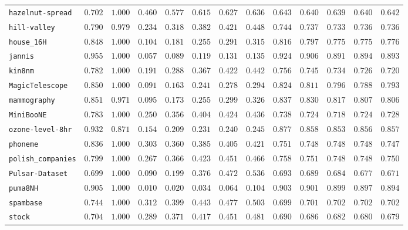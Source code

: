 {\begin{tabular}{@{}lcccccccccccc@{}}
\texttt{hazelnut-spread} & $0.702$ & $1.000$ & $0.460$ & $0.577$ & $0.615$ & $0.627$ & $0.636$ & $0.643$ & $0.640$ & $0.639$ & $0.640$ & $0.642$ \\
\texttt{hill-valley} & $0.790$ & $0.979$ & $0.234$ & $0.318$ & $0.382$ & $0.421$ & $0.448$ & $0.744$ & $0.737$ & $0.733$ & $0.736$ & $0.736$ \\
\texttt{house\_16H} & $0.848$ & $1.000$ & $0.104$ & $0.181$ & $0.255$ & $0.291$ & $0.315$ & $0.816$ & $0.797$ & $0.775$ & $0.775$ & $0.776$ \\
\texttt{jannis} & $0.955$ & $1.000$ & $0.057$ & $0.089$ & $0.119$ & $0.131$ & $0.135$ & $0.924$ & $0.906$ & $0.891$ & $0.894$ & $0.893$ \\
\texttt{kin8nm} & $0.782$ & $1.000$ & $0.191$ & $0.288$ & $0.367$ & $0.422$ & $0.442$ & $0.756$ & $0.745$ & $0.734$ & $0.726$ & $0.720$ \\
\texttt{MagicTelescope} & $0.850$ & $1.000$ & $0.091$ & $0.163$ & $0.241$ & $0.278$ & $0.294$ & $0.824$ & $0.811$ & $0.796$ & $0.788$ & $0.793$ \\
\texttt{mammography} & $0.851$ & $0.971$ & $0.095$ & $0.173$ & $0.255$ & $0.299$ & $0.326$ & $0.837$ & $0.830$ & $0.817$ & $0.807$ & $0.806$ \\
\texttt{MiniBooNE} & $0.783$ & $1.000$ & $0.250$ & $0.356$ & $0.404$ & $0.424$ & $0.436$ & $0.738$ & $0.724$ & $0.718$ & $0.724$ & $0.728$ \\
\texttt{ozone-level-8hr} & $0.932$ & $0.871$ & $0.154$ & $0.209$ & $0.231$ & $0.240$ & $0.245$ & $0.877$ & $0.858$ & $0.853$ & $0.856$ & $0.857$ \\
\texttt{phoneme} & $0.836$ & $1.000$ & $0.303$ & $0.360$ & $0.385$ & $0.405$ & $0.421$ & $0.751$ & $0.748$ & $0.748$ & $0.748$ & $0.747$ \\
\texttt{polish\_companies} & $0.799$ & $1.000$ & $0.267$ & $0.366$ & $0.423$ & $0.451$ & $0.466$ & $0.758$ & $0.751$ & $0.748$ & $0.748$ & $0.750$ \\
\texttt{Pulsar-Dataset} & $0.699$ & $1.000$ & $0.090$ & $0.199$ & $0.376$ & $0.472$ & $0.536$ & $0.693$ & $0.689$ & $0.684$ & $0.677$ & $0.671$ \\
\texttt{puma8NH} & $0.905$ & $1.000$ & $0.010$ & $0.020$ & $0.034$ & $0.064$ & $0.104$ & $0.903$ & $0.901$ & $0.899$ & $0.897$ & $0.894$ \\
\texttt{spambase} & $0.744$ & $1.000$ & $0.312$ & $0.399$ & $0.443$ & $0.477$ & $0.503$ & $0.699$ & $0.701$ & $0.702$ & $0.702$ & $0.702$ \\
\texttt{stock} & $0.704$ & $1.000$ & $0.289$ & $0.371$ & $0.417$ & $0.451$ & $0.481$ & $0.690$ & $0.686$ & $0.682$ & $0.680$ & $0.679$ \\

\end{tabular}}

